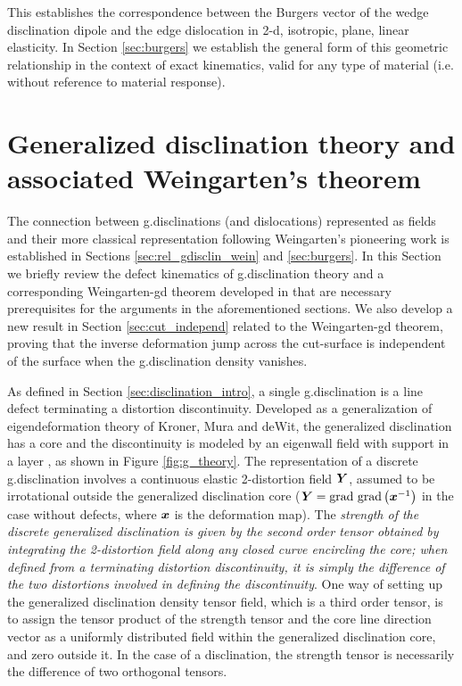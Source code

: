 \documentclass[11pt,letterpaper]{article}
\begin{document}
This establishes the correspondence between the Burgers vector of the wedge disclination dipole and the edge dislocation in 2-d, isotropic, plane, linear elasticity. In Section \ref{sec:burgers} we establish the general form of this geometric relationship in the context of exact kinematics, valid for any type of material (i.e. without reference to material response).

\section{Generalized disclination theory and associated Weingarten's theorem}\label{sec:g_disclination_theory}

The connection between g.disclinations (and dislocations) represented as fields and their more classical representation following Weingarten's pioneering work is established in Sections \ref{sec:rel_gdisclin_wein} and \ref{sec:burgers}.  In this Section we briefly review the defect kinematics of g.disclination theory  and a corresponding Weingarten-gd theorem developed in \cite{acharya2015continuum} that are necessary prerequisites for the arguments in the aforementioned sections. We also develop a new result in Section \ref{sec:cut_independ} related to the Weingarten-gd theorem, proving that the inverse deformation jump across the cut-surface is independent of the surface when the g.disclination density vanishes.

As defined in Section \ref{sec:disclination_intro}, a single g.disclination is a line defect terminating a distortion discontinuity. Developed as a generalization of eigendeformation theory of Kroner, Mura and deWit, the generalized disclination has a core and the discontinuity is modeled by an eigenwall field with support in a layer \cite{acharya2015continuum}, as shown in Figure \ref{fig:g_theory}. The representation of a discrete g.disclination involves a continuous elastic 2-distortion field $\bfY$, assumed to be irrotational outside the generalized disclination core ($ \bfY = \grad \, \grad \left(\bfx^{-1}\right)$ in the case without defects, where $\bfx$ is the deformation map). The \emph{strength of the discrete generalized disclination is given by the second order tensor obtained by integrating the 2-distortion field along any closed curve encircling the core; when defined from a terminating distortion discontinuity, it is simply the difference of the two distortions involved in defining the discontinuity}. One way of setting up the generalized disclination density tensor field, which is a third order tensor, is to assign the tensor product of the strength tensor and the core line direction vector as a uniformly distributed field within the generalized disclination core, and zero outside it. In the case of a disclination, the strength tensor is necessarily the difference of two orthogonal tensors. 
\end{document}
